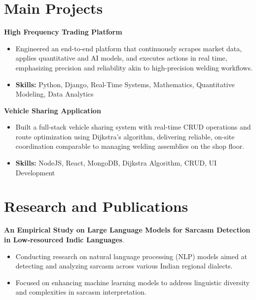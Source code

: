 \documentclass[a4paper,11pt]{article}
\begin{document}
\section{\textbf{Main Projects}}

\vspace{1mm}
  \textbf{High Frequency Trading Platform  }
\vspace{-1.5mm} %
\begin{itemize}
  \item Engineered an end-to-end platform that continuously scrapes market data, applies quantitative and AI models, and executes actions in real time, emphasizing precision and reliability akin to high-precision welding workflows.
\vspace{-3mm}
  \item \textbf{Skills:} Python, Django, Real-Time Systems, Mathematics, Quantitative Modeling, Data Analytics
\end{itemize}


\vspace{1mm}
   \textbf{Vehicle Sharing Application }
\vspace{-1.5mm} %
\begin{itemize}
  \item Built a full-stack vehicle sharing system with real-time CRUD operations and route optimization using Dijkstra's algorithm, delivering reliable, on-site coordination comparable to managing welding assemblies on the shop floor.
\vspace{-3mm}
  \item \textbf{Skills:} NodeJS, React, MongoDB, Dijkstra Algorithm, CRUD, UI Development
\end{itemize}



\section{\textbf{Research and Publications} \hfill }
\vspace{1mm}
  \textbf{An Empirical Study on Large Language Models for Sarcasm Detection in Low-resourced Indic Languages}.
\vspace{-1mm} %
\begin{itemize}
  \item Conducting research on natural language processing (NLP) models aimed at detecting and analyzing sarcasm across various Indian regional dialects.
\vspace{-3mm}
  \item Focused on enhancing machine learning models to address linguistic diversity and complexities in sarcasm interpretation.
\end{itemize}
\end{document}
